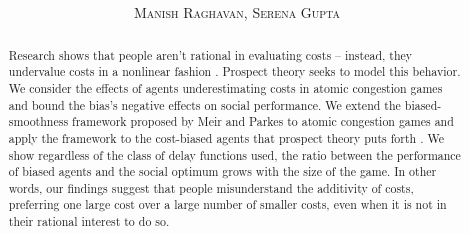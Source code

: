 \documentclass[twoside]{article}
\title{\vspace{-15mm}\fontsize{24pt}{10pt}\selectfont\textbf{\titlee}} %
\author{
\large
\textsc{Manish Raghavan, Serena Gupta}
\vspace{-5mm}
}
\begin{document}
\maketitle %

\thispagestyle{fancy} %

\begin{abstract}

  Research shows that people aren't rational in evaluating costs --
  instead, they undervalue costs in a nonlinear fashion
  \cite{Kahneman1979}. Prospect theory seeks to model this
  behavior. We consider the effects of agents underestimating costs in atomic congestion
  games and bound the bias's negative effects on social performance. We extend the
  biased-smoothness framework proposed by Meir and Parkes to atomic congestion
  games and apply the framework to the cost-biased agents that prospect theory puts forth
  \cite{Meir2014}. We show regardless of the class of delay functions used, the
  ratio between the performance of biased agents and the social optimum grows
  with the size of the game. In other words, our findings suggest that people
  misunderstand the additivity of costs, preferring one large cost over a large
  number of smaller costs, even when it is not in their rational interest to do
  so.

\end{abstract}
\end{document}
